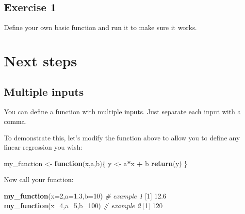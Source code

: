 \documentclass[
]{book}
\newenvironment{Shaded}{\begin{snugshade}}{\end{snugshade}}
\newcommand{\CommentTok}[1]{\textcolor[rgb]{0.56,0.35,0.01}{\textit{#1}}}
\newcommand{\ControlFlowTok}[1]{\textcolor[rgb]{0.13,0.29,0.53}{\textbf{#1}}}
\newcommand{\DataTypeTok}[1]{\textcolor[rgb]{0.13,0.29,0.53}{#1}}
\newcommand{\DecValTok}[1]{\textcolor[rgb]{0.00,0.00,0.81}{#1}}
\newcommand{\FloatTok}[1]{\textcolor[rgb]{0.00,0.00,0.81}{#1}}
\newcommand{\KeywordTok}[1]{\textcolor[rgb]{0.13,0.29,0.53}{\textbf{#1}}}
\newcommand{\NormalTok}[1]{#1}
\newcommand{\OperatorTok}[1]{\textcolor[rgb]{0.81,0.36,0.00}{\textbf{#1}}}
\newcommand{\StringTok}[1]{\textcolor[rgb]{0.31,0.60,0.02}{#1}}
\begin{document}
\hypertarget{exercise-1-5}{%
\subsection*{Exercise 1}\label{exercise-1-5}}

Define your own basic function and run it to make sure it works.

\hypertarget{next-steps}{%
\section*{Next steps}\label{next-steps}}

\hypertarget{multiple-inputs}{%
\subsection*{Multiple inputs}\label{multiple-inputs}}

You can define a function with multiple inputs. Just separate each input with a comma.

To demonstrate this, let's modify the function above to allow you to define any linear regression you wish:

\begin{Shaded}
\begin{Highlighting}[]
\NormalTok{my_function <-}\StringTok{ }\ControlFlowTok{function}\NormalTok{(x,a,b)\{}
\NormalTok{  y <-}\StringTok{ }\NormalTok{a}\OperatorTok{*}\NormalTok{x }\OperatorTok{+}\StringTok{ }\NormalTok{b}
  \KeywordTok{return}\NormalTok{(y)}
\NormalTok{\}}
\end{Highlighting}
\end{Shaded}

Now call your function:

\begin{Shaded}
\begin{Highlighting}[]
\KeywordTok{my_function}\NormalTok{(}\DataTypeTok{x=}\DecValTok{2}\NormalTok{,}\DataTypeTok{a=}\FloatTok{1.3}\NormalTok{,}\DataTypeTok{b=}\DecValTok{10}\NormalTok{) }\CommentTok{# example 1}
\NormalTok{[}\DecValTok{1}\NormalTok{] }\FloatTok{12.6}
\KeywordTok{my_function}\NormalTok{(}\DataTypeTok{x=}\DecValTok{4}\NormalTok{,}\DataTypeTok{a=}\DecValTok{5}\NormalTok{,}\DataTypeTok{b=}\DecValTok{100}\NormalTok{) }\CommentTok{# example 2}
\NormalTok{[}\DecValTok{1}\NormalTok{] }\DecValTok{120}
\end{Highlighting}
\end{Shaded}
\end{document}
